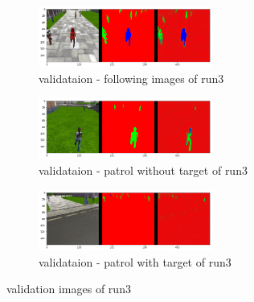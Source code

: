 \documentclass[paper=a4, fontsize=11pt]{scrartcl} %
\numberwithin{equation}{section} %
\numberwithin{figure}{section} %
\numberwithin{table}{section} %
\begin{document}
\begin{figure}[ht]
	\begin{subfigure}{0.33\textwidth}
	\includegraphics[width=0.9\linewidth, height=2cm]{./imgs/following_images3.png} 
	\caption{validataion - following images of run3}
	\label{fig:subfollowing_images3}
	\end{subfigure}
	\begin{subfigure}{0.33\textwidth}
	\includegraphics[width=0.9\linewidth, height=2cm]{./imgs/patrol_non_targ3.png}
	\caption{validataion - patrol without target of run3}
	\label{fig:subpatrol_non_targ3}
	\end{subfigure}
	\begin{subfigure}{0.33\textwidth}
	\includegraphics[width=0.9\linewidth, height=2cm]{./imgs/patrol_with_targ3.png}
	\caption{validataion - patrol with target of run3}
	\label{fig:subpatrol_with_targ3}
	\end{subfigure}

	\caption{validation images of run3}
	\label{fig:outputimages3}
\end{figure}
\end{document}
